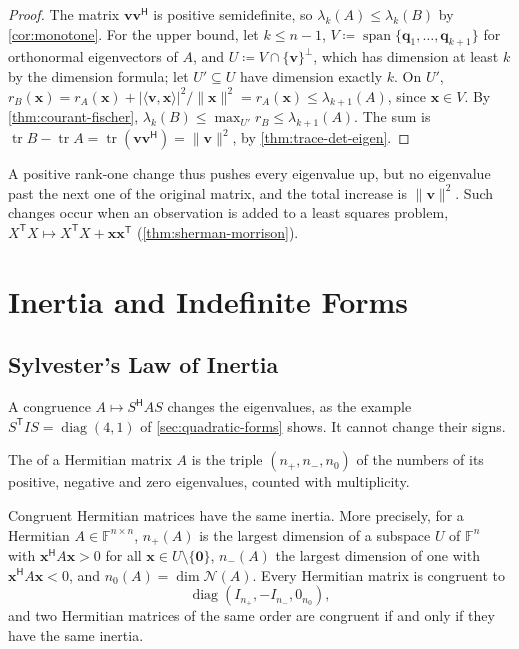 \begin{proof}
The matrix $\mathbf v\mathbf v^{\mathsf H}$ is positive semidefinite, so $\lambda_k(A)\le\lambda_k(B)$ by \cref{cor:monotone}. For the upper bound, let $k\le n-1$, $V\coloneqq\operatorname{span}\{\mathbf q_1,\ldots,\mathbf q_{k+1}\}$ for orthonormal eigenvectors of $A$, and $U\coloneqq V\cap\{\mathbf v\}^\perp$, which has dimension at least $k$ by the dimension formula; let $U'\subseteq U$ have dimension exactly $k$. On $U'$, $r_B(\mathbf x)=r_A(\mathbf x)+|\langle\mathbf v,\mathbf x\rangle|^2/\|\mathbf x\|^2=r_A(\mathbf x)\le\lambda_{k+1}(A)$, since $\mathbf x\in V$. By \cref{thm:courant-fischer}, $\lambda_k(B)\le\max_{U'}r_B\le\lambda_{k+1}(A)$. The sum is $\operatorname{tr}B-\operatorname{tr}A=\operatorname{tr}(\mathbf v\mathbf v^{\mathsf H})=\|\mathbf v\|^2$, by \cref{thm:trace-det-eigen}.
\end{proof}

A positive rank-one change thus pushes every eigenvalue up, but no eigenvalue past the next one of the original matrix, and the total increase is $\|\mathbf v\|^2$. Such changes occur when an observation is added to a least squares problem, $X^{\mathsf T}X\mapsto X^{\mathsf T}X+\mathbf x\mathbf x^{\mathsf T}$ (\cref{thm:sherman-morrison}).

\section{Inertia and Indefinite Forms}
\label{sec:inertia}

\subsection{Sylvester's Law of Inertia}

A congruence $A\mapsto S^{\mathsf H}AS$ changes the eigenvalues, as the example $S^{\mathsf T}IS=\operatorname{diag}(4,1)$ of \cref{sec:quadratic-forms} shows. It cannot change their signs.

\begin{definition}[Inertia]
\label{def:inertia}
The  of a Hermitian matrix $A$ is the triple $(n_+,n_-,n_0)$ of the numbers of its positive, negative and zero eigenvalues, counted with multiplicity.
\end{definition}

\begin{theorem}
\label{thm:inertia}
Congruent Hermitian matrices have the same inertia. More precisely, for a Hermitian $A\in\mathbb F^{n\times n}$, $n_+(A)$ is the largest dimension of a subspace $U$ of $\mathbb F^n$ with $\mathbf x^{\mathsf H}A\mathbf x>0$ for all $\mathbf x\in U\setminus\{\mathbf 0\}$, $n_-(A)$ the largest dimension of one with $\mathbf x^{\mathsf H}A\mathbf x<0$, and $n_0(A)=\dim\mathcal N(A)$. Every Hermitian matrix is congruent to
\[
\operatorname{diag}(I_{n_+},-I_{n_-},0_{n_0}),
\]
and two Hermitian matrices of the same order are congruent if and only if they have the same inertia.
\end{theorem}

